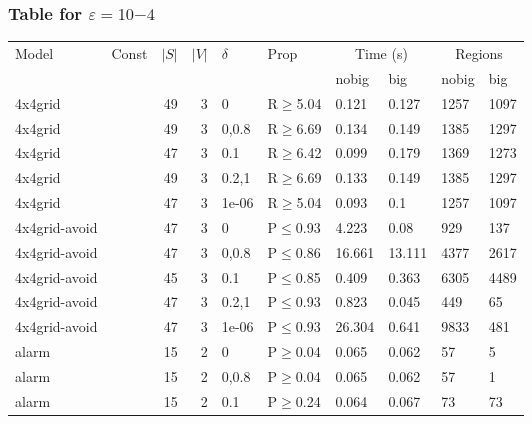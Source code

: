 \subsubsection{Table for \(\varepsilon=10{-4}\)}
\begin{longtable}{llrrllllll}

        \toprule
        Model & Const & $|S|$ & $|V|$ & $\delta$ & Prop & \multicolumn{2}{c}{Time (s)} & \multicolumn{2}{c}{Regions} \\
        \cmidrule(ll){7-8} \cmidrule(ll){9-10}
        & & & & & & nobig & big & nobig & big \\
        \midrule
        
 4x4grid       &          &     	49 &   3 & 0     & R$\geq$5.04  & 0.121    & 0.127    & 1257    & 1097    \\
 4x4grid       &          &     	49 &   3 & 0,0.8 & R$\geq$6.69  & 0.134    & 0.149    & 1385    & 1297    \\
 4x4grid       &          &     	47 &   3 & 0.1   & R$\geq$6.42  & 0.099    & 0.179    & 1369    & 1273    \\
 4x4grid       &          &     	49 &   3 & 0.2,1 & R$\geq$6.69  & 0.133    & 0.149    & 1385    & 1297    \\
 4x4grid       &          &     	47 &   3 & 1e-06 & R$\geq$5.04  & 0.093    & 0.1      & 1257    & 1097    \\
 4x4grid-avoid &          &     	47 &   3 & 0     & P$\leq$0.93  & 4.223    & 0.08     & 929     & 137     \\
 4x4grid-avoid &          &     	47 &   3 & 0,0.8 & P$\leq$0.86  & 16.661   & 13.111   & 4377    & 2617    \\
 4x4grid-avoid &          &     	45 &   3 & 0.1   & P$\leq$0.85  & 0.409    & 0.363    & 6305    & 4489    \\
 4x4grid-avoid &          &     	47 &   3 & 0.2,1 & P$\leq$0.93  & 0.823    & 0.045    & 449     & 65      \\
 4x4grid-avoid &          &     	47 &   3 & 1e-06 & P$\leq$0.93  & 26.304   & 0.641    & 9833    & 481     \\
 alarm         &          &     	15 &   2 & 0     & P$\geq$0.04  & 0.065    & 0.062    & 57      & 5       \\
 alarm         &          &     	15 &   2 & 0,0.8 & P$\geq$0.04  & 0.065    & 0.062    & 57      & 1       \\
 alarm         &          &     	15 &   2 & 0.1   & P$\geq$0.24  & 0.064    & 0.067    & 73      & 73      \\

\end{longtable}
